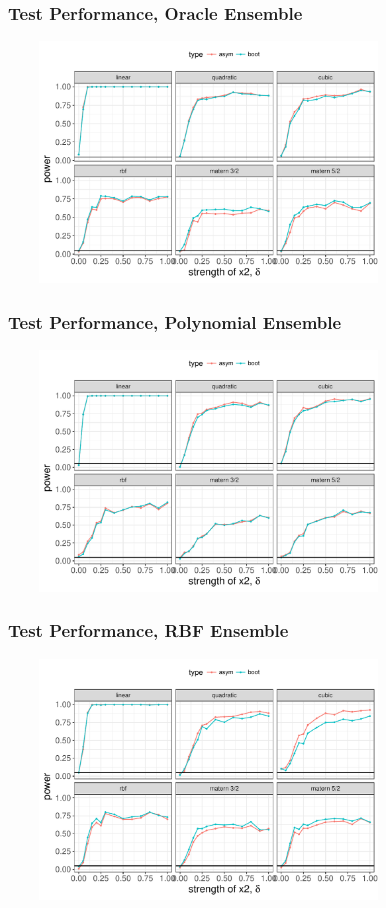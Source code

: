 \documentclass{beamer}
\begin{document}
\begin{frame}  
\frametitle{Test Performance, Oracle Ensemble}
\begin{center}
 \includegraphics[height=6.4cm, width=10.6cm]{./plot/true_mod} 
\end{center}
\end{frame}

\begin{frame}  
\frametitle{Test Performance, Polynomial Ensemble}
\begin{center}
 \includegraphics[height=6.4cm, width=10.6cm]{./plot/poly_mod} 
\end{center}
\end{frame}

\begin{frame}  
\frametitle{Test Performance, RBF Ensemble}
\begin{center}
 \includegraphics[height=6.4cm, width=10.6cm]{./plot/rbf_mod} 
\end{center}
\end{frame} 
\end{document}

